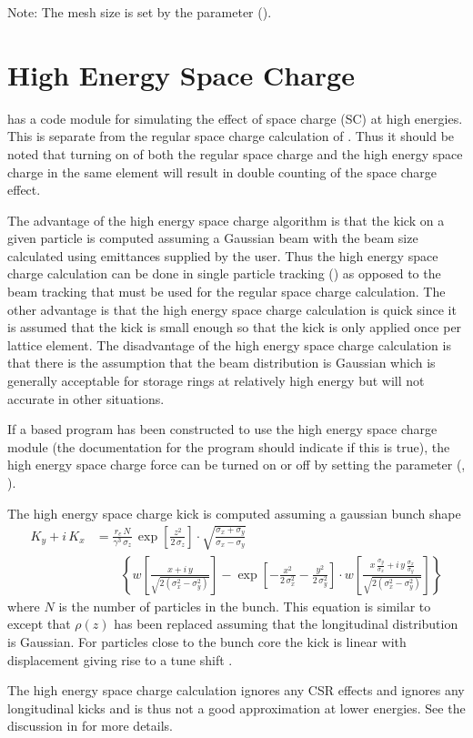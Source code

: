 Note: The mesh size is set by the  parameter 
().

\section{High Energy Space Charge}
\label{s:he.space.charge}

\bmad has a code module for simulating the effect of space charge (SC) at high energies. This is
separate from the regular space charge calculation of . Thus it should be noted that
turning on of both the regular space charge and the high energy space charge in the same element
will result in double counting of the space charge effect.

The advantage of the high energy space charge algorithm is that the kick on a given particle is
computed assuming a Gaussian beam with the beam size calculated using emittances supplied by the
user. Thus the high energy space charge calculation can be done in single particle tracking
() as opposed to the beam tracking that must be used for the regular space charge
calculation. The other advantage is that the high energy space charge calculation is quick since it
is assumed that the kick is small enough so that the kick is only applied once per lattice
element. The disadvantage of the high energy space charge calculation is that there is the
assumption that the beam distribution is Gaussian which is generally acceptable for storage rings at
relatively high energy but will not accurate in other situations.

If a \bmad based program has been constructed to use the high energy space charge module (the
documentation for the program should indicate if this is true), the high energy space charge force
can be turned on or off by setting the  parameter
(, ). 

The high energy space charge kick is computed assuming a gaussian bunch shape 
\begin{align}
  K_y + i \, K_x &=
  \frac{r_e \, N}{\gamma^3 \, \sigma_z} \, \exp \left[ \frac{z^2}{2 \, \sigma_z} \right] \cdot
  \sqrt{\frac{\sigma_x + \sigma_y}{\sigma_x - \sigma_y}} \label{fsp1r2} \\
  & \qquad \left\{ w \left[ \frac{x + i \, y}{\sqrt{2 (\sigma_x^2 - \sigma_y^2)}} \right] -
  \exp \left[ -\frac{x^2}{2 \, \sigma_x^2} - \frac{y^2}{2 \, \sigma_y^2} \right] \cdot
  w \left[ \frac{x \, \frac{\sigma_y}{\sigma_x} + i \, y \, \frac{\sigma_x}{\sigma_y}}
  {\sqrt{2 (\sigma_x^2 - \sigma_y^2)}} \right] \right\}
  \nonumber 
\end{align}
where $N$ is the number of particles in the bunch. This equation is similar to  except
that $\rho(z)$ has been replaced assuming that the longitudinal distribution is Gaussian. For
particles close to the bunch core the kick is linear with displacement giving rise to a tune shift
\cite{b:decking}.

The high energy space charge calculation ignores any CSR effects and ignores any longitudinal kicks
and is thus not a good approximation at lower energies. See the discussion in \cite{b:csr} for more
details.






